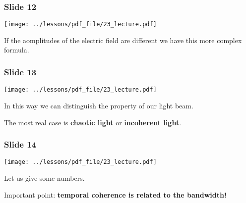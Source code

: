 \documentclass[../main/main.tex]{subfiles}
\begin{document}
\subsubsection*{Slide 12}

\begin{minipage}[]{0.5\linewidth}
\centering
\texttt{[image: ../lessons/pdf\_file/23\_lecture.pdf]}
\end{minipage}
\hspace{0.3cm}\vspace{0.3cm}
\begin{minipage}[c]{0.47\linewidth}

If the aomplitudes of the electric field are different we have this more complex formula.

\end{minipage}

\subsubsection*{Slide 13}

\begin{minipage}[]{0.5\linewidth}
\centering
\texttt{[image: ../lessons/pdf\_file/23\_lecture.pdf]}
\end{minipage}
\hspace{0.3cm}\vspace{0.3cm}
\begin{minipage}[c]{0.47\linewidth}

In this way we can distinguish the property of our light beam.

The most real case is \textbf{chaotic light} or \textbf{incoherent light}.

\end{minipage}

\subsubsection*{Slide 14}

\begin{minipage}[]{0.5\linewidth}
\centering
\texttt{[image: ../lessons/pdf\_file/23\_lecture.pdf]}
\end{minipage}
\hspace{0.3cm}\vspace{0.3cm}
\begin{minipage}[c]{0.47\linewidth}

Let us give some numbers.

Important point: \textbf{temporal coherence is related to the bandwidth!}

\end{minipage}
\end{document}
